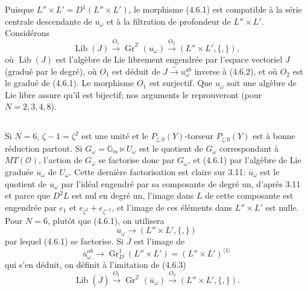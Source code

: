 \documentclass[11pt,a4paper]{article}
\theoremstyle{plain}
\theoremstyle{definition}
\DeclareMathOperator{\Lib}{Lib}
\newcommand{\Gm}{\mathbb{G}_m}
\newcommand{\Z}{\mathbb{Z}}
\newcommand{\Gr}{\operatorname{Gr}}
\begin{document}
Puisque $L'' \times L' = D^1(L'' \times L')$, le morphisme (4.6.1) est compatible \`a la s\'erie centrale descendante de $u_\omega$ et \`a la filtration de profondeur de $L'' \times L'$. Consid\'erons
\begin{equation}\label{eq:4.6.3}
\Lib(J) \xrightarrow{O_1} \Gr^\Z(u_\omega) \xrightarrow{O_2} (L'' \times L', \{,\}),
\end{equation}
o\`u $\Lib(J)$ est l'alg\`ebre de Lie librement engendr\'ee par l'espace vectoriel $J$ (gradu\'e par le degr\'e), o\`u $O_1$ est d\'eduit de $J \xrightarrow{\sim} u_\omega^{ab}$ inverse \`a (4.6.2), et o\`u $O_2$ est le gradu\'e de (4.6.1). Le morphisme $O_1$ est surjectif. Que $u_\omega$ soit une alg\`ebre de Lie libre assure qu'il est bijectif; nos arguments le reprouveront (pour $N=2,3,4,8$).

\subsection{}
Si $N=6$, $\zeta - 1 = \zeta^2$ est une unit\'e et le $P_{\zeta,0}(Y)$-torseur $P_{\zeta,0}(Y)$ est \`a bonne r\'eduction partout. Si $G_\omega = \Gm \ltimes U_\omega$ est le quotient de $G_\omega$ correspondant \`a $MT(\mathcal{O})$, l'action de $G_\omega$ se factorise donc par $G_\omega$, et (4.6.1) par l'alg\`ebre de Lie gradu\'ee $\overline{u}_\omega$ de $U_\omega$. Cette derni\`ere factorisation est claire sur 3.11: $\overline{u}_\omega$ est le quotient de $u_\omega$ par l'id\'eal engendr\'e par sa composante de degr\'e un, d'apr\`es 3.11 et parce que $D^2L$ est nul en degr\'e un, l'image dans $L$ de cette composante est engendr\'ee par $e_1$ et $e_{\zeta^2} + e_{\zeta^{-2}}$, et l'image de ces \'el\'ements dans $L'' \times L'$ est nulle. Pour $N=6$, plut\^ot que (4.6.1), on utilisera
\begin{equation}\label{eq:4.7.1}
\overline{u}_\omega \to (L'' \times L', \{,\})
\end{equation}
par lequel (4.6.1) se factorise. Si $\overline{J}$ est l'image de
\begin{equation}\label{eq:4.7.2}
\overline{u}_\omega^{ab} \to \Gr_D^1(L'' \times L') = (L'' \times L')^{\langle 1 \rangle}
\end{equation}
qui s'en d\'eduit, on d\'efinit \`a l'imitation de (4.6.3)
\begin{equation}\label{eq:4.7.3}
\Lib(\overline{J}) \xrightarrow{O_1} \Gr^\Z(\overline{u}_\omega) \xrightarrow{O_2} (L'' \times L', \{,\}).
\end{equation}
\end{document}
